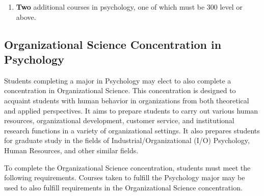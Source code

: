 \documentclass[
  letterpaper,
]{scrbook}
\providecommand{\tightlist}{%
  \setlength{\itemsep}{0pt}\setlength{\parskip}{0pt}}
\begin{document}
\begin{enumerate}
  \begin{itemize}
  \tightlist
  \item
    PSY 325/325L Health Psychology and Laboratory (WE)\\
  \item
    PSY 335/335L Sensation and Perception and Laboratory (WE)\\
  \item
    PSY 355/355L Personality \& Laboratory (WE)\\
  \end{itemize}
\item
  \textbf{Two} additional courses in psychology, one of which must be
  300 level or above.
\end{enumerate}

\subsection{Organizational Science Concentration in
Psychology}\label{organizational-science-concentration-in-psychology}

Students completing a major in Psychology may elect to also complete a
concentration in Organizational Science. This concentration is designed
to acquaint students with human behavior in organizations from both
theoretical and applied perspectives. It aims to prepare students to
carry out various human resources, organizational development, customer
service, and institutional research functions in a variety of
organizational settings. It also prepares students for graduate study in
the fields of Industrial/Organizational (I/O) Psychology, Human
Resources, and other similar fields.

To complete the Organizational Science concentration, students must meet
the following requirements. Courses taken to fulfill the Psychology
major may be used to also fulfill requirements in the Organizational
Science concentration.
\end{document}
